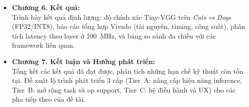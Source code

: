 \begin{itemize}
    \item \textbf{Chương 6. Kết quả:} \\
    Trình bày kết quả định lượng: độ chính xác Tiny-VGG trên \textit{Cats vs Dogs} (FP32/INT8), báo cáo tổng hợp Vivado (tài nguyên, timing, công suất), phân tích latency theo layer ở 100~MHz, và bảng so sánh đa chiều với các framework liên quan.

    \item \textbf{Chương 7. Kết luận và Hướng phát triển:} \\
    Tổng kết các kết quả đã đạt được, phân tích những hạn chế kỹ thuật còn tồn tại. Đề xuất lộ trình phát triển 3 cấp (Tier~A: nâng cấp hiệu năng inference, Tier~B: mở rộng task và op support, Tier~C: hệ điều hành và UX) cho các pha tiếp theo của đề tài.
\end{itemize}